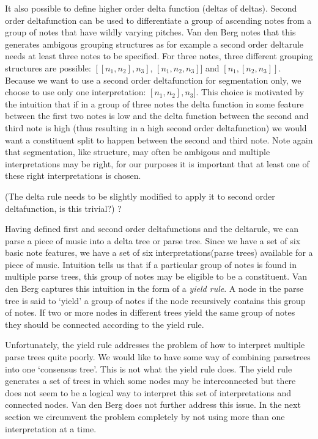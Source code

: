 \documentclass[a4paper,10pt]{article}
\begin{document}
It also possible to define higher order delta function (deltas of deltas). Second order deltafunction can be used to differentiate a group of ascending notes from a group of notes that have wildly varying pitches. Van den Berg notes that this generates ambigous grouping structures as for example a second order deltarule needs at least three notes to be specified. For three notes, three different grouping structures are possible: $[[n_1, n_2], n_3]$, $[n_1, n_2, n_3]]$ and $[n_1, [n_2, n_3]]$. Because we want to use a second order deltafunction for segmentation only, we choose to use only one interpretation: $[n_1, n_2], n_3]$. This choice is motivated by the intuition that if in a group of three notes the delta function in some feature between the first two notes is low and the delta function between the second and third note is high (thus resulting in a high second order deltafunction) we would want a constituent split to happen between the second and third note. Note again that segmentation, like structure, may often be ambigous and multiple interpretations may be right, for our purposes it is important that at least one of these right interpretations is chosen. 

(The delta rule needs to be slightly modified to apply it to second order deltafunction, is this trivial?) ?

Having defined first and second order deltafunctions and the deltarule, we can parse a piece of music into a delta tree or parse tree. Since we have a set of six basic note features, we have a set of six interpretations(parse trees) available for a piece of music. Intuition tells us that if a particular group of notes is found in multiple parse trees, this group of notes may be eligible to be a constituent. Van den Berg captures this intuition in the form of a \textit{yield rule}. A node in the parse tree is said to `yield' a group of notes if the node recursively contains this group of notes. If two or more nodes in different trees yield the same group of notes they should be connected according to the yield rule.

Unfortunately, the yield rule addresses the problem of how to interpret multiple parse trees quite poorly. We would like to have some way of combining parsetrees into one `consensus tree'. This is not what the yield rule does. The yield rule generates a set of trees in which some nodes may be interconnected but there does not seem to be a logical way to interpret this set of interpretations and connected nodes. Van den Berg does not further address this issue. In the next section we circumvent the problem completely by not using more than one interpretation at a time.
\end{document}
